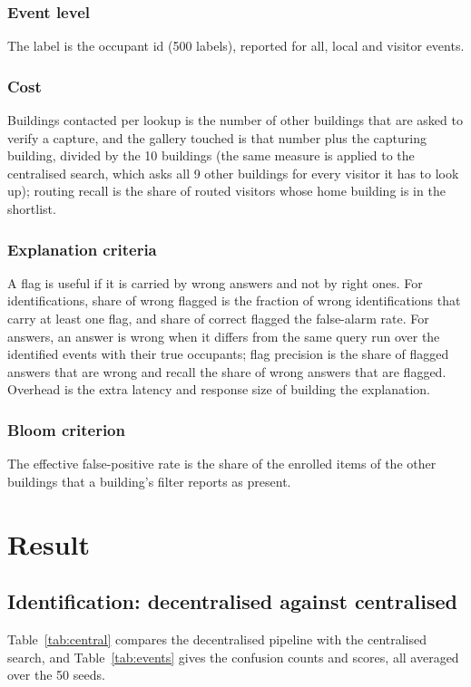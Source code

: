 \documentclass[12pt,a4paper,oneside]{report}
\begin{document}
\subsubsection{Event level}
The label is the occupant id (500 labels), reported for all, local and visitor events.

\subsubsection{Cost}
Buildings contacted per lookup is the number of other buildings that are asked to verify a capture, and the gallery touched is that number plus the capturing building, divided by the 10 buildings (the same measure is applied to the centralised search, which asks all 9 other buildings for every visitor it has to look up); routing recall is the share of routed visitors whose home building is in the shortlist.

\subsubsection{Explanation criteria}
A flag is useful if it is carried by wrong answers and not by right ones. For identifications, share of wrong flagged is the fraction of wrong identifications that carry at least one flag, and share of correct flagged the false-alarm rate. For answers, an answer is wrong when it differs from the same query run over the identified events with their true occupants; flag precision is the share of flagged answers that are wrong and recall the share of wrong answers that are flagged. Overhead is the extra latency and response size of building the explanation.

\subsubsection{Bloom criterion}
The effective false-positive rate is the share of the enrolled items of the other buildings that a building's filter reports as present.

\section{Result}
\subsection{Identification: decentralised against centralised}\label{sec:res-events}
Table~\ref{tab:central} compares the decentralised pipeline with the centralised search, and Table~\ref{tab:events} gives the confusion counts and scores, all averaged over the 50 seeds.
\end{document}
